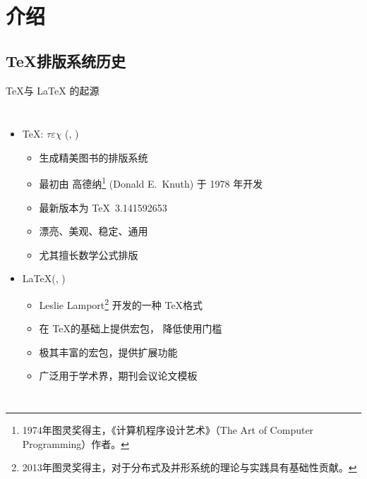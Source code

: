 

\section{介绍}

\subsection{\TeX 排版系统历史}

\begin{frame}[fragile]{\TeX 与 \LaTeX{} 的起源}
  \begin{columns}[T]
    \begin{itemize}
      \item \TeX: $\tau\varepsilon\chi$ (,
        )
        \begin{itemize}
          \item 生成精美图书的排版系统
          \item 最初由 高德纳\footnote{1974年图灵奖得主，《计算机程序设计艺术》（The Art of Computer Programming）作者。} (Donald E.~Knuth) 于 1978 年开发  
          \item 最新版本为 \TeX\ 3.141592653
          \item 漂亮、美观、稳定、通用
          \item 尤其擅长数学公式排版
        \end{itemize}
        \vspace{2em}
      \item \LaTeX{}(, )
        \begin{itemize}
          \item Leslie Lamport\footnote{2013年图灵奖得主，对于分布式及并形系统的理论与实践具有基础性贡献。} 开发的一种 \TeX 格式
          \item 在 \TeX 的基础上提供宏包， 降低使用门槛
          \item 极其丰富的宏包，提供扩展功能
          \item 广泛用于学术界，期刊会议论文模板
        \end{itemize}
    \end{itemize}
    \vspace*{-5mm}

\end{columns}
\end{frame}
